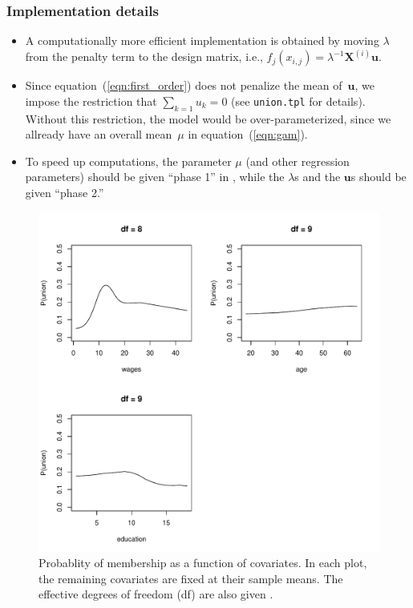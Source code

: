 \documentclass{admbmanual}
\begin{document}
\subsubsection{Implementation details}
\begin{itemize}
\item A computationally more efficient implementation is obtained by moving $\lambda $ from the penalty term to the design matrix, i.e., $f_{j}(x_{i,j})=\lambda ^{-1}\mathbf{X}^{(i)}\mathbf{u}$.

\item Since equation~(\ref{eqn:first_order}) does not penalize the mean of~$\mathbf{u}$, we impose the restriction that $\sum_{k=1}u_{k}=0$ (see \texttt{union.tpl} for details). Without this restriction, the model would be
over-parameterized, since we allready have an overall mean~$\mu $ in equation~(\ref{eqn:gam}).

\item To speed up computations, the parameter $\mu $ (and other regression
parameters) should be given ``phase 1'' in \scAB, while the $\lambda $s and
the $\mathbf{u}$s should be given ``phase 2.''
\end{itemize}

\begin{figure}[h]
\centering\hskip1pt
\includegraphics[width=6in]{union_fig.pdf}
\caption{Probablity of membership as a function of covariates. In each plot,
the remaining covariates are fixed at their sample means. The effective
degrees of freedom (df) are also given \protect\cite{hast:tibs:1990}.}
\label{fig:union}
\end{figure}
\end{document}
